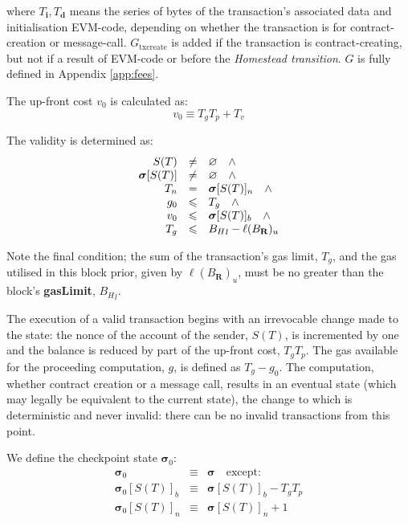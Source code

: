\documentclass[9pt,oneside]{amsart}
\begin{document}
\begin{multicols}{2}
where $T_\mathbf{i},T_\mathbf{d}$ means the series of bytes of the transaction's associated data and initialisation EVM-code, depending on whether the transaction is for contract-creation or message-call. $G_\text{txcreate}$ is added if the transaction is contract-creating, but not if a result of EVM-code or before the {\it Homestead transition}. $G$ is fully defined in Appendix \ref{app:fees}.


The up-front cost $v_0$ is calculated as:
\begin{equation}
v_0 \equiv T_g T_p + T_v
\end{equation}

The validity is determined as:
\begin{equation}
\begin{array}[t]{rcl}
S(T) & \neq & \varnothing \quad \wedge \\
\boldsymbol{\sigma}[S(T)] & \neq & \varnothing \quad \wedge \\
T_n & = & \boldsymbol{\sigma}[S(T)]_n \quad \wedge \\
g_0 & \leqslant & T_g \quad \wedge \\
v_0 & \leqslant & \boldsymbol{\sigma}[S(T)]_b \quad \wedge \\
T_g & \leqslant & {B_H}_l - \ell(B_\mathbf{R})_u
\end{array}
\end{equation}

Note the final condition; the sum of the transaction's gas limit, $T_g$, and the gas utilised in this block prior, given by $\ell(B_\mathbf{R})_u$, must be no greater than the block's \textbf{gasLimit}, ${B_H}_l$.

The execution of a valid transaction begins with an irrevocable change made to the state: the nonce of the account of the sender, $S(T)$, is incremented by one and the balance is reduced by part of the up-front cost, $T_gT_p$. The gas available for the proceeding computation, $g$, is defined as $T_g - g_0$. The computation, whether contract creation or a message call, results in an eventual state (which may legally be equivalent to the current state), the change to which is deterministic and never invalid: there can be no invalid transactions from this point.

We define the checkpoint state $\boldsymbol{\sigma}_0$:
\begin{eqnarray}
\boldsymbol{\sigma}_0 & \equiv & \boldsymbol{\sigma} \quad \text{except:} \\
\boldsymbol{\sigma}_0[S(T)]_b & \equiv & \boldsymbol{\sigma}[S(T)]_b - T_g T_p \\
\boldsymbol{\sigma}_0[S(T)]_n & \equiv & \boldsymbol{\sigma}[S(T)]_n + 1
\end{eqnarray}


\end{multicols}
\end{document}

